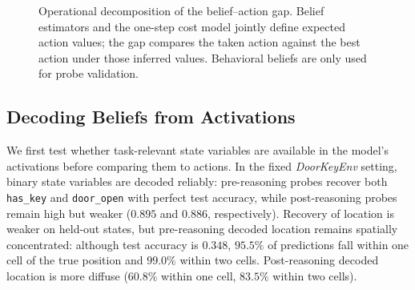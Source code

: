 \documentclass[10pt,twocolumn]{article}
\begin{document}
\begin{figure}[t]
\centering
{}
\caption{Operational decomposition of the belief--action gap. Belief estimators and the one-step cost model jointly define expected action values; the gap compares the taken action against the best action under those inferred values. Behavioral beliefs are only used for probe validation. }
\label{fig:pipeline}
\end{figure}



\subsection{Decoding Beliefs from Activations}

We first test whether task-relevant state variables are available in the
model's activations before comparing them to actions. In the fixed \textit{DoorKeyEnv}
setting, binary state variables are decoded reliably: pre-reasoning probes
recover both \texttt{has\_key} and \texttt{door\_open} with perfect test
accuracy, while post-reasoning probes remain high but weaker
($0.895$ and $0.886$, respectively). Recovery of location is weaker on held-out states,
but pre-reasoning decoded location remains spatially concentrated:
although test accuracy is $0.348$, $95.5\%$ of predictions fall within
one cell of the true position and $99.0\%$ within two cells. Post-reasoning
decoded location is more diffuse ($60.8\%$ within one cell,
$83.5\%$ within two cells).
\end{document}
